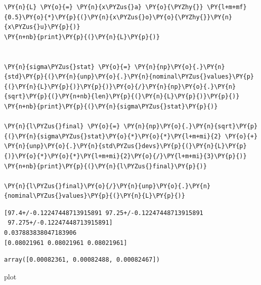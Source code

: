     \begin{tcolorbox}[breakable, size=fbox, boxrule=1pt, pad at break*=1mm,colback=cellbackground, colframe=cellborder]
\begin{Verbatim}[commandchars=\\\{\}]
\PY{n}{L} \PY{o}{=} \PY{n}{x\PYZus{}a} \PY{o}{\PYZhy{}} \PY{l+m+mf}{0.5}\PY{o}{*}\PY{p}{(}\PY{n}{x\PYZus{}o}\PY{o}{\PYZhy{}}\PY{n}{x\PYZus{}u}\PY{p}{)}
\PY{n+nb}{print}\PY{p}{(}\PY{n}{L}\PY{p}{)}


\PY{n}{sigma\PYZus{}stat} \PY{o}{=} \PY{n}{np}\PY{o}{.}\PY{n}{std}\PY{p}{(}\PY{n}{unp}\PY{o}{.}\PY{n}{nominal\PYZus{}values}\PY{p}{(}\PY{n}{L}\PY{p}{)}\PY{p}{)}\PY{o}{/}\PY{n}{np}\PY{o}{.}\PY{n}{sqrt}\PY{p}{(}\PY{n+nb}{len}\PY{p}{(}\PY{n}{L}\PY{p}{)}\PY{p}{)}
\PY{n+nb}{print}\PY{p}{(}\PY{n}{sigma\PYZus{}stat}\PY{p}{)}

\PY{n}{l\PYZus{}final} \PY{o}{=} \PY{n}{np}\PY{o}{.}\PY{n}{sqrt}\PY{p}{(}\PY{n}{sigma\PYZus{}stat}\PY{o}{*}\PY{o}{*}\PY{l+m+mi}{2} \PY{o}{+} \PY{n}{unp}\PY{o}{.}\PY{n}{std\PYZus{}devs}\PY{p}{(}\PY{n}{L}\PY{p}{)}\PY{o}{*}\PY{o}{*}\PY{l+m+mi}{2}\PY{o}{/}\PY{l+m+mi}{3}\PY{p}{)}
\PY{n+nb}{print}\PY{p}{(}\PY{n}{l\PYZus{}final}\PY{p}{)}

\PY{n}{l\PYZus{}final}\PY{o}{/}\PY{n}{unp}\PY{o}{.}\PY{n}{nominal\PYZus{}values}\PY{p}{(}\PY{n}{L}\PY{p}{)}
\end{Verbatim}
\end{tcolorbox}

    \begin{Verbatim}[commandchars=\\\{\}]
[97.4+/-0.12247448713915891 97.25+/-0.12247448713915891
 97.275+/-0.12247448713915891]
0.037883838047183906
[0.08021961 0.08021961 0.08021961]
    \end{Verbatim}

            \begin{tcolorbox}[breakable, size=fbox, boxrule=.5pt, pad at break*=1mm, opacityfill=0]
\begin{Verbatim}[commandchars=\\\{\}]
array([0.00082361, 0.00082488, 0.00082467])
\end{Verbatim}
\end{tcolorbox}
        
    plot

